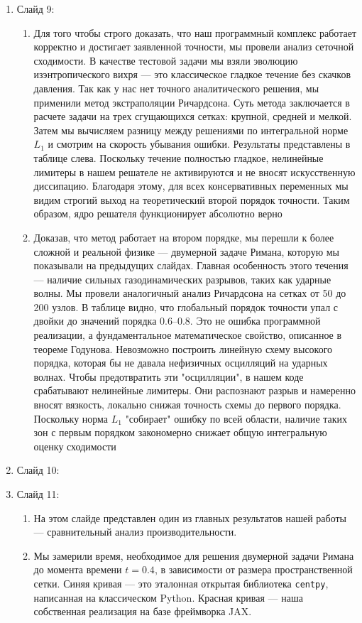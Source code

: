 \documentclass[12pt, a4paper]{article}
\theoremstyle{gostdef}
\begin{document}
\begin{enumerate}
\begin{enumerate}
		\end{enumerate}
		\item Слайд 9:
		\begin{enumerate}
			\item Для того чтобы строго доказать, что наш программный комплекс работает корректно и достигает заявленной точности, мы провели анализ сеточной сходимости.
			В качестве тестовой задачи мы взяли эволюцию изэнтропического вихря — это классическое гладкое течение без скачков давления. Так как у нас нет точного аналитического решения, мы применили метод экстраполяции Ричардсона. Суть метода заключается в расчете задачи на трех сгущающихся сетках: крупной, средней и мелкой. Затем мы вычисляем разницу между решениями по интегральной норме $L_1$ и смотрим на скорость убывания ошибки.
			Результаты представлены в таблице слева. Поскольку течение полностью гладкое, нелинейные лимитеры в нашем решателе не активируются и не вносят искусственную диссипацию. Благодаря этому, для всех консервативных переменных мы видим строгий выход на теоретический второй порядок точности. Таким образом, ядро решателя функционирует абсолютно верно
			\item Доказав, что метод работает на втором порядке, мы перешли к более сложной и реальной физике — двумерной задаче Римана, которую мы показывали на предыдущих слайдах. Главная особенность этого течения — наличие сильных газодинамических разрывов, таких как ударные волны.
			Мы провели аналогичный анализ Ричардсона на сетках от 50 до 200 узлов. В таблице видно, что глобальный порядок точности упал с двойки до значений порядка 0.6–0.8.
			Это не ошибка программной реализации, а фундаментальное математическое свойство, описанное в теореме Годунова. Невозможно построить линейную схему высокого порядка, которая бы не давала нефизичных осцилляций на ударных волнах. Чтобы предотвратить эти "осцилляции", в нашем коде срабатывают нелинейные лимитеры. Они распознают разрыв и намеренно вносят вязкость, локально снижая точность схемы до первого порядка. Поскольку норма $L_1$ "собирает" ошибку по всей области, наличие таких зон с первым порядком закономерно снижает общую интегральную оценку сходимости
		\end{enumerate}
		\item Слайд 10:
		\item Слайд 11:
		\begin{enumerate}
			\item На этом слайде представлен один из главных результатов нашей работы — сравнительный анализ производительности.
			\item Мы замерили время, необходимое для решения двумерной задачи Римана до момента времени $t = 0.4$, в зависимости от размера пространственной сетки. Синяя кривая — это эталонная открытая библиотека \texttt{centpy}, написанная на классическом Python. Красная кривая — наша собственная реализация на базе фреймворка JAX.

\end{enumerate}
\end{enumerate}
\end{document}
